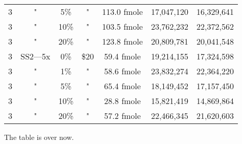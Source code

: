 \begin{table}[htdp]
\begin{center}
\begin{tabular}{|c|c|c|c|c|c|c|}
3 & " & 5\% & " & 113.0 fmole & 17,047,120 &16,329,641 \\
3 & " & 10\% & " & 103.5 fmole & 23,762,232 &22,372,562 \\
3 & " & 20\% & " & 123.8 fmole & 20,809,781 &20,041,548 \\
3 & SS2---5x & 0\% & \$20 & 59.4 fmole & 19,214,155 &17,324,598 \\
3 & " & 1\% & " & 58.6 fmole & 23,832,274 &22,364,220 \\
3 & " & 5\% & " & 65.4 fmole & 18,149,452 &17,157,450 \\
3 & " & 10\% & " & 28.8 fmole & 15,821,419 &14,869,864 \\
3 & " & 20\% & " & 57.2 fmole & 22,466,345 &21,620,603 \\\hline
\end{tabular}
\label{tab:protocols}
\end{center}
\end{table}
      

The table is over now.